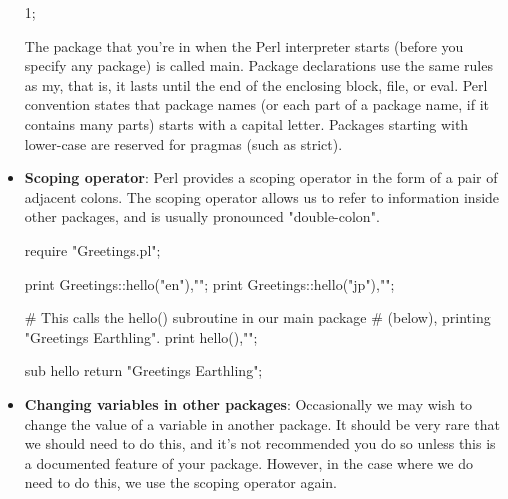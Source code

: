 \documentclass{report}
\begin{document}
\begin{itemize}
\begin{perlcode}
                1;
            \end{perlcode}
            \bigbreak \noindent 
            The package that you’re in when the Perl interpreter starts (before you specify any package) is called main. Package declarations use the same rules as my, that is, it lasts until the end of the enclosing block, file, or eval.
            \bigbreak \noindent 
            Perl convention states that package names (or each part of a package name, if it contains many parts) starts with a capital letter. Packages starting with lower-case are reserved for pragmas (such as strict).
        \item \textbf{Scoping operator}: Perl provides a scoping operator in the form of a pair of adjacent colons. The scoping operator allows us to refer to information inside other packages, and is usually pronounced "double-colon".
            \bigbreak \noindent 
            \begin{perlcode}
                require "Greetings.pl";

                print Greetings::hello("en"),"\n";
                print Greetings::hello("jp"),"\n";

                # This calls the hello() subroutine in our main package
                # (below), printing "Greetings Earthling".
                print hello(),"\n";

                sub hello {
                    return "Greetings Earthling";
                }
            \end{perlcode}
        \item \textbf{Changing variables in other packages}: Occasionally we may wish to change the value of a variable in another package. It should be very rare that we should need to do this, and it’s not recommended you do so unless this is a documented feature of your package. However, in the case where we do need to do this, we use the scoping operator again.
            \bigbreak \noindent 
            \bigbreak \noindent 
\end{itemize}
\end{document}
